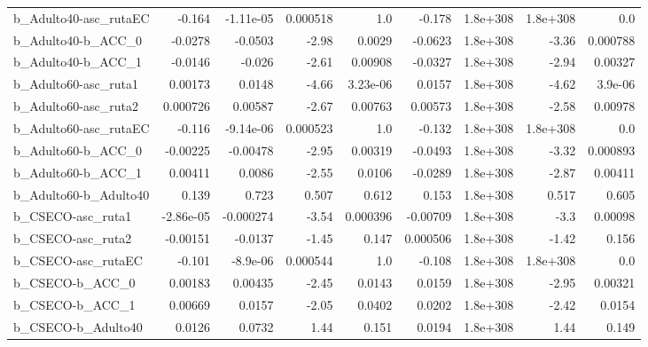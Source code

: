 \begin{tabular}{lrrrrrrrr}
b\_Adulto40-asc\_rutaEC        &      -0.164 &    -1.11e-05 &  0.000518 &      1.0 &     -0.178 &    1.8e+308 &     1.8e+308 &           0.0 \\
b\_Adulto40-b\_ACC\_0           &     -0.0278 &      -0.0503 &     -2.98 &   0.0029 &    -0.0623 &    1.8e+308 &        -3.36 &      0.000788 \\
b\_Adulto40-b\_ACC\_1           &     -0.0146 &       -0.026 &     -2.61 &  0.00908 &    -0.0327 &    1.8e+308 &        -2.94 &       0.00327 \\
b\_Adulto60-asc\_ruta1         &     0.00173 &       0.0148 &     -4.66 & 3.23e-06 &     0.0157 &    1.8e+308 &        -4.62 &       3.9e-06 \\
b\_Adulto60-asc\_ruta2         &    0.000726 &      0.00587 &     -2.67 &  0.00763 &    0.00573 &    1.8e+308 &        -2.58 &       0.00978 \\
b\_Adulto60-asc\_rutaEC        &      -0.116 &    -9.14e-06 &  0.000523 &      1.0 &     -0.132 &    1.8e+308 &     1.8e+308 &           0.0 \\
b\_Adulto60-b\_ACC\_0           &    -0.00225 &     -0.00478 &     -2.95 &  0.00319 &    -0.0493 &    1.8e+308 &        -3.32 &      0.000893 \\
b\_Adulto60-b\_ACC\_1           &     0.00411 &       0.0086 &     -2.55 &   0.0106 &    -0.0289 &    1.8e+308 &        -2.87 &       0.00411 \\
b\_Adulto60-b\_Adulto40        &       0.139 &        0.723 &     0.507 &    0.612 &      0.153 &    1.8e+308 &        0.517 &         0.605 \\
b\_CSECO-asc\_ruta1            &   -2.86e-05 &    -0.000274 &     -3.54 & 0.000396 &   -0.00709 &    1.8e+308 &         -3.3 &       0.00098 \\
b\_CSECO-asc\_ruta2            &    -0.00151 &      -0.0137 &     -1.45 &    0.147 &   0.000506 &    1.8e+308 &        -1.42 &         0.156 \\
b\_CSECO-asc\_rutaEC           &      -0.101 &     -8.9e-06 &  0.000544 &      1.0 &     -0.108 &    1.8e+308 &     1.8e+308 &           0.0 \\
b\_CSECO-b\_ACC\_0              &     0.00183 &      0.00435 &     -2.45 &   0.0143 &     0.0159 &    1.8e+308 &        -2.95 &       0.00321 \\
b\_CSECO-b\_ACC\_1              &     0.00669 &       0.0157 &     -2.05 &   0.0402 &     0.0202 &    1.8e+308 &        -2.42 &        0.0154 \\
b\_CSECO-b\_Adulto40           &      0.0126 &       0.0732 &      1.44 &    0.151 &     0.0194 &    1.8e+308 &         1.44 &         0.149 \\

\end{tabular}
